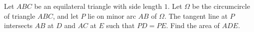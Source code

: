 Let $ABC$ be an equilateral triangle with side length $1$. Let $\Omega$ be the circumcircle of triangle $ABC$, and let $P$ lie on minor arc $AB$ of $\Omega$. The tangent line at $P$ intersects $AB$ at $D$ and $AC$ at $E$ such that $PD=PE$. Find the area of $ADE$.

